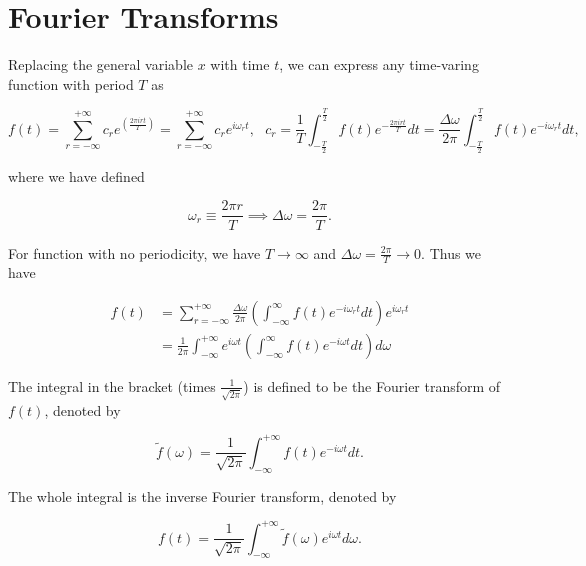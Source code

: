 \documentclass[english,a4paper,12pt]{report}
\begin{document}
\section{Fourier Transforms}

Replacing the general variable \(x\) with time \(t\), we can express any time-varing function with period \(T\) as 

\begin{equation}
    f(t) = \sum_{r=-\infty}^{+\infty} c_{r} e^{\left( \frac{2\pi irt}{T}  \right)} = \sum_{r=-\infty}^{+\infty} c_{r} e^{i\omega _{r} t }, ~~~ c_{r} = \frac{1}{T} \int_{-\frac{T}{2} }^{\frac{T}{2} } f(t) e^{-\frac{2\pi irt}{T} }dt = \frac{\Delta \omega }{2\pi } \int_{-\frac{T}{2} }^{\frac{T}{2} } f(t) e^{-i \omega _{r} t} dt    ,        
\end{equation}

where we have defined 

\begin{equation}
    \omega _{r} \equiv \frac{2\pi r}{T} \implies \Delta \omega = \frac{2\pi }{T}.   
\end{equation}

For function with no periodicity, we have \(T \to \infty\) and \(\displaystyle \Delta \omega = \frac{2\pi }{T} \to 0 \). Thus we have

\begin{equation}
    \begin{aligned} 
    f(t) &= \sum_{r=-\infty}^{+\infty} \frac{\Delta \omega }{2\pi } \left( \int_{-\infty}^{\infty } f(t) e^{- i \omega _{r} t} dt \right) e^{i \omega _{r} t} \\
    &= \frac{1}{2\pi } \int_{-\infty}^{+\infty} e^{i \omega t}  \left( \int_{-\infty}^{\infty } f(t) e^{- i \omega t} dt \right) d \omega 
    \end{aligned} 
\end{equation}

The integral in the bracket (times \(\displaystyle \frac{1}{\sqrt{2\pi } } \)) is defined to be the Fourier transform of \(f(t)\), denoted by 

\begin{equation}
    \tilde{f}(\omega ) = \frac{1}{\sqrt{2\pi } } \int_{-\infty}^{+\infty} f(t) e^{-i \omega t}dt.     
\end{equation}

The whole integral is the inverse Fourier transform, denoted by 

\begin{equation}
    f(t) = \frac{1}{\sqrt{2\pi } } \int_{-\infty}^{+\infty} \tilde{f}(\omega )e^{i \omega t} d \omega .     
\end{equation}
\end{document}
